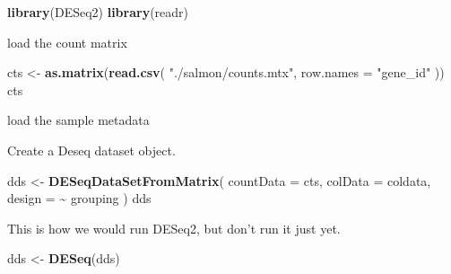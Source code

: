 \documentclass[
]{book}
\newenvironment{Shaded}{\begin{snugshade}}{\end{snugshade}}
\newcommand{\AttributeTok}[1]{\textcolor[rgb]{0.13,0.29,0.53}{#1}}
\newcommand{\FunctionTok}[1]{\textcolor[rgb]{0.13,0.29,0.53}{\textbf{#1}}}
\newcommand{\NormalTok}[1]{#1}
\newcommand{\OtherTok}[1]{\textcolor[rgb]{0.56,0.35,0.01}{#1}}
\newcommand{\SpecialCharTok}[1]{\textcolor[rgb]{0.81,0.36,0.00}{\textbf{#1}}}
\newcommand{\StringTok}[1]{\textcolor[rgb]{0.31,0.60,0.02}{#1}}
\begin{document}
\begin{Shaded}
\begin{Highlighting}[numbers=left,,]
\FunctionTok{library}\NormalTok{(DESeq2)}
\FunctionTok{library}\NormalTok{(readr)}
\end{Highlighting}
\end{Shaded}

load the count matrix

\begin{Shaded}
\begin{Highlighting}[numbers=left,,]
\NormalTok{cts }\OtherTok{\textless{}{-}} \FunctionTok{as.matrix}\NormalTok{(}\FunctionTok{read.csv}\NormalTok{(}
    \StringTok{"./salmon/counts.mtx"}\NormalTok{,}
    \AttributeTok{row.names =} \StringTok{"gene\_id"}
\NormalTok{))}
\NormalTok{cts}
\end{Highlighting}
\end{Shaded}

load the sample metadata

\begin{Shaded}
\end{Shaded}

Create a Deseq dataset object.

\begin{Shaded}
\begin{Highlighting}[numbers=left,,]
\NormalTok{dds }\OtherTok{\textless{}{-}} \FunctionTok{DESeqDataSetFromMatrix}\NormalTok{(}
  \AttributeTok{countData =}\NormalTok{ cts,}
  \AttributeTok{colData =}\NormalTok{ coldata,}
  \AttributeTok{design =} \SpecialCharTok{\textasciitilde{}}\NormalTok{ grouping}
\NormalTok{)}
\NormalTok{dds}
\end{Highlighting}
\end{Shaded}

This is how we would run DESeq2, but don't run it just yet.

\begin{Shaded}
\begin{Highlighting}[numbers=left,,]
\NormalTok{dds }\OtherTok{\textless{}{-}} \FunctionTok{DESeq}\NormalTok{(dds)}
\end{Highlighting}
\end{Shaded}
\end{document}
